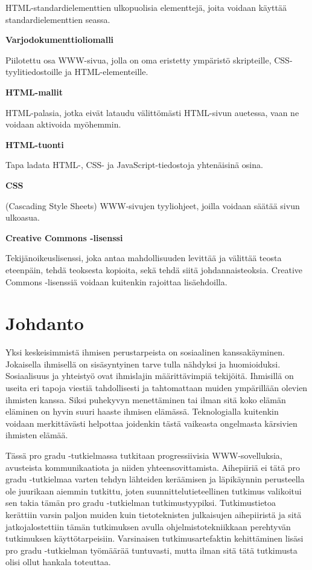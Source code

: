 \documentclass[utf8]{gradu3}
\begin{document}
\begin{thetermlist}
HTML-standardielementtien ulkopuolisia elementtejä, joita voidaan käyttää standardielementtien seassa.

\item[\textbf{Varjodokumenttioliomalli}] 

Piilotettu osa WWW-sivua, jolla on oma eristetty ympäristö skripteille, CSS-tyylitiedostoille ja HTML-elementeille.

\item[\textbf{HTML-mallit}] 

HTML-palasia, jotka eivät lataudu välittömästi HTML-sivun auetessa, vaan ne voidaan aktivoida myöhemmin.

\item[\textbf{HTML-tuonti}] 

Tapa ladata HTML-, CSS- ja JavaScript-tiedostoja yhtenäisinä osina.

\item[\textbf{CSS}] 

(Cascading Style Sheets) WWW-sivujen tyyliohjeet, joilla voidaan säätää sivun ulkoasua. 

\item[\textbf{Creative Commons -lisenssi}] 

Tekijänoikeuslisenssi, joka antaa mahdollisuuden levittää ja välittää teosta eteenpäin, tehdä teoksesta kopioita, sekä tehdä siitä johdannaisteoksia. Creative Commons -lisenssiä voidaan kuitenkin rajoittaa lisäehdoilla.

\end{thetermlist}

\mainmatter

\chapter{Johdanto}

Yksi keskeisimmistä ihmisen perustarpeista on sosiaalinen kanssakäyminen. Jokaisella ihmisellä on sisäsyntyinen tarve tulla nähdyksi ja huomioiduksi. Sosiaalisuus ja yhteistyö ovat ihmislajin määrittävimpiä tekijöitä. Ihmisillä on useita eri tapoja viestiä tahdollisesti ja tahtomattaan muiden ympärillään olevien ihmisten kanssa. Siksi puhekyvyn menettäminen tai ilman sitä koko elämän eläminen on hyvin suuri haaste ihmisen elämässä. Teknologialla kuitenkin voidaan merkittävästi helpottaa joidenkin tästä vaikeasta ongelmasta kärsivien ihmisten elämää.

Tässä pro gradu -tutkielmassa tutkitaan progressiivisia WWW-sovelluksia, avusteista kommunikaatiota ja niiden yhteensovittamista. Aihepiiriä ei tätä pro gradu -tutkielmaa varten tehdyn lähteiden keräämisen ja läpikäynnin perusteella ole juurikaan aiemmin tutkittu, joten suunnittelutieteellinen tutkimus valikoitui sen takia tämän pro gradu -tutkielman tutkimustyypiksi. Tutkimustietoa kerättiin varsin paljon muiden kuin tietoteknisten julkaisujen aihepiiristä ja sitä jatkojalostettiin tämän tutkimuksen avulla ohjelmistotekniikkaan perehtyvän tutkimuksen käyttötarpeisiin. Varsinaisen tutkimusartefaktin kehittäminen lisäsi pro gradu -tutkielman työmäärää tuntuvasti, mutta ilman sitä tätä tutkimusta olisi ollut hankala toteuttaa.
\end{document}
